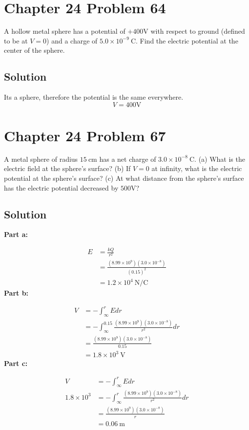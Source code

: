 \documentclass{article}
\newcommand{\m}{\text{m}}
\newcommand{\centi}{\text{c}}
\newcommand{\C}{\text{C}}
\newcommand{\V}{\text{V}}
\begin{document}
\section*{Chapter 24 Problem 64}
A hollow metal sphere has a potential of $+400 \V$ with respect
to ground (defined to be at $V = 0$) and a charge of $5.0 \times 10^{-9}\ \C$. Find
the electric potential at the center of the sphere.

\subsection*{Solution}
Its a sphere, therefore the potential is the same everywhere.
\[
    \boxed{V = 400\V}
\]

\section*{Chapter 24 Problem 67}
A metal sphere of radius $15\ \centi \m$ has a net charge of
$3.0 \times 10^{-8}\ \C$. (a) What is the electric field at the sphere’s surface?
(b) If $V = 0$ at infinity, what is the electric potential at the sphere’s
surface? (c) At what distance from the sphere’s surface has the
electric potential decreased by $500 \V$?

\subsection*{Solution}
\textbf{Part a:}

\begin{align*}
    E &= \frac{kQ}{r^2} \\
    &= \frac{(8.99 \times 10^9)(3.0 \times 10^{-8})}{(0.15)^2} \\
    &= \boxed{1.2 \times 10^4\ \text{N/C}}
\end{align*}
\textbf{Part b:}

\begin{align*}
    V &= -\int_\infty^r E dr \\
    &= -\int_\infty^{0.15} \frac{(8.99 \times 10^9)(3.0 \times 10^{-8})}{r^2} dr \\
    &= \frac{(8.99 \times 10^9)(3.0 \times 10^{-8})}{0.15} \\
    &= \boxed{1.8 \times 10^3\ \text{V}}
\end{align*}
\textbf{Part c:}

\begin{align*}
    V &= -\int_\infty^r E dr \\
    1.8 \times 10^3 &= -\int_\infty^r \frac{(8.99 \times 10^9)(3.0 \times 10^{-8})}{r^2} dr \\
    &= \frac{(8.99 \times 10^9)(3.0 \times 10^{-8})}{r} \\
    &= \boxed{0.06\ \text{m}}
\end{align*}
\end{document}

